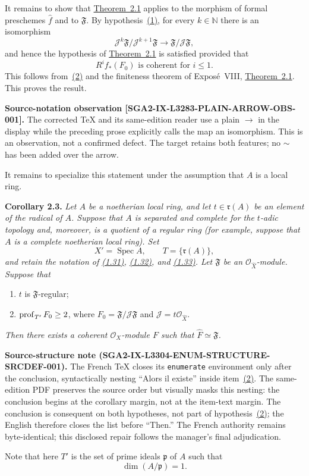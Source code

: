 \medskip
It remains to show that \hyperref[IX.2.1]{Theorem~2.1} applies to the morphism of formal
preschemes $\widehat f$ and to $\mathfrak F$. By hypothesis~\hyperref[IX.2.2]{(1)}, for every
$k\in\mathbb N$ there is an isomorphism
\[
\mathcal J^k\mathfrak F/\mathcal J^{k+1}\mathfrak F
  \to \mathfrak F/\mathcal J\mathfrak F,
\]
and hence the hypothesis of \hyperref[IX.2.1]{Theorem~2.1} is satisfied provided that
\[
R^i f_*(F_0)\text{ is coherent for }i\leq 1.
\]
This follows from~\hyperref[IX.2.2]{(2)} and the finiteness theorem of Expos\'e~VIII,
\hyperref[IX.2.1]{Theorem~2.1}. This proves the result.

\medskip
\noindent\colorbox{softgray}{\parbox{0.95\linewidth}{\footnotesize
\color{notegray}\textbf{Source-notation observation
[SGA2-IX-L3283-PLAIN-ARROW-OBS-001].}
The corrected TeX and its same-edition reader use a plain $\to$ in the
display while the preceding prose explicitly calls the map an isomorphism.
This is an observation, not a confirmed defect. The target retains both
features; no $\sim$ has been added over the arrow.}}

\medskip
It remains to specialize this statement under the assumption that $A$ is a
local ring.

\medskip
{}\noindent\textbf{Corollary 2.3.}\quad
\emph{Let $A$ be a noetherian local ring, and let
$t\in\mathfrak r(A)$ be an element of the radical of $A$. Suppose that $A$
is separated and complete for the $t$-adic topology and, moreover, is a
quotient of a regular ring (for example, suppose that $A$ is a complete
noetherian local ring). Set}
\begin{equation}
\tag{2.9}\label{eq:IX.2.9}
X'=\operatorname{Spec}A,\qquad T=\{\mathfrak r(A)\},
\end{equation}
\emph{and retain the notation of \hyperref[eq:IX.1.31]{(1.31)}, \hyperref[eq:IX.1.32]{(1.32)}, and \hyperref[eq:IX.1.33]{(1.33)}. Let
$\mathfrak F$ be an $\mathcal O_{\widehat X}$-module. Suppose that}
\begin{enumerate}
\item $t$ is $\mathfrak F$-regular;
\item $\operatorname{prof}_{T'}F_0\geq 2$, where
$F_0=\mathfrak F/\mathcal J\mathfrak F$ and
$\mathcal J=t\mathcal O_{\widehat X}$.
\end{enumerate}
\emph{Then there exists a coherent $\mathcal O_X$-module $F$ such that
$\widehat F\simeq\mathfrak F$.}

\medskip
\noindent\colorbox{softgray}{\parbox{0.95\linewidth}{\footnotesize
\color{notegray}\textbf{Source-structure note
(SGA2-IX-L3304-ENUM-STRUCTURE-SRCDEF-001).}
The French TeX closes its \texttt{enumerate} environment only after the
conclusion, syntactically nesting ``Alors il existe'' inside item~\hyperref[IX.2.3]{(2)}. The
same-edition PDF preserves the source order but visually masks this nesting:
the conclusion begins at the corollary margin, not at the item-text margin.
The conclusion is consequent on both hypotheses, not part of hypothesis~\hyperref[IX.2.3]{(2)};
the English therefore closes the list before ``Then.'' The French authority
remains byte-identical; this disclosed repair follows the manager's final
adjudication.}}

\medskip
\noindent Note that here $T'$ is the set of prime ideals $\mathfrak p$ of
$A$ such that
\[
  \dim(A/\mathfrak p)=1.
\]
